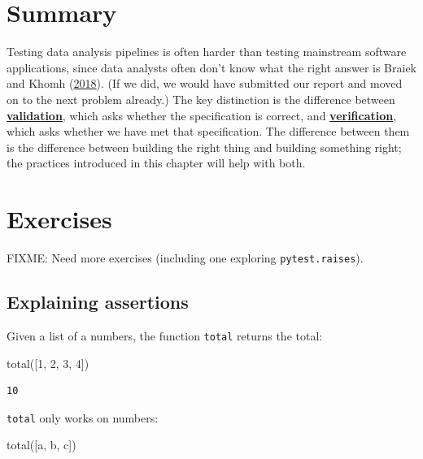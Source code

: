 \documentclass[
]{krantz}
\makeatletter
\newenvironment{Shaded}{\begin{snugshade}}{\end{snugshade}}
\newcommand{\DecValTok}[1]{\textcolor[rgb]{0.00,0.00,0.81}{#1}}
\newcommand{\NormalTok}[1]{#1}
\newcommand{\StringTok}[1]{\textcolor[rgb]{0.31,0.60,0.02}{#1}}
\newenvironment{kframe}{%
\medskip{}
\setlength{\fboxsep}{.8em}
 \def\at@end@of@kframe{}%
 \ifinner\ifhmode%
  \def\at@end@of@kframe{\end{minipage}}%
  \begin{minipage}{\columnwidth}%
 \fi\fi%
 \def\FrameCommand##1{\hskip\@totalleftmargin \hskip-\fboxsep
 \colorbox{shadecolor}{##1}\hskip-\fboxsep
     \hskip-\linewidth \hskip-\@totalleftmargin \hskip\columnwidth}%
 \MakeFramed {\advance\hsize-\width
   \@totalleftmargin\z@ \linewidth\hsize
   \@setminipage}}%
 {\par\unskip\endMakeFramed%
 \at@end@of@kframe}
\renewenvironment{Shaded}{\begin{kframe}}{\end{kframe}}
\newcommand{\gref}[2]{\hyperlink{#2}{\textbf{#1}}}
\makeatother
\begin{document}
\hypertarget{testing-summary}{%
\section{Summary}\label{testing-summary}}

Testing data analysis pipelines is often harder than testing mainstream software applications,
since data analysts often don't know what the right answer is Braiek and Khomh (\protect\hyperlink{ref-Brai2018}{2018}).
(If we did,
we would have submitted our report and moved on to the next problem already.)
The key distinction is the difference between \gref{validation}{validation},
which asks whether the specification is correct,
and \gref{verification}{verification},
which asks whether we have met that specification.
The difference between them is the difference between
building the right thing and building something right;
the practices introduced in this chapter will help with both.

\hypertarget{testing-exercises}{%
\section{Exercises}\label{testing-exercises}}

FIXME: Need more exercises (including one exploring \texttt{pytest.raises}).

\hypertarget{testing-ex-explain-assertions}{%
\subsection{Explaining assertions}\label{testing-ex-explain-assertions}}

Given a list of a numbers,
the function \texttt{total} returns the total:

\begin{Shaded}
\begin{Highlighting}[]
\NormalTok{total([}\DecValTok{1}\NormalTok{, }\DecValTok{2}\NormalTok{, }\DecValTok{3}\NormalTok{, }\DecValTok{4}\NormalTok{])}
\end{Highlighting}
\end{Shaded}

\begin{verbatim}
10
\end{verbatim}

\texttt{total} only works on numbers:

\begin{Shaded}
\begin{Highlighting}[]
\NormalTok{total([}\StringTok{\textquotesingle{}a\textquotesingle{}}\NormalTok{, }\StringTok{\textquotesingle{}b\textquotesingle{}}\NormalTok{, }\StringTok{\textquotesingle{}c\textquotesingle{}}\NormalTok{])}
\end{Highlighting}
\end{Shaded}
\end{document}

